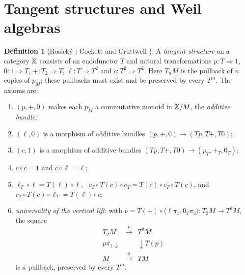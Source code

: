 \documentclass[11pt]{article}
\theoremstyle{definition}\newtheorem{definition}[theorem]{Definition}\newtheorem{remark}[theorem]{Remark}\newtheorem{example}[theorem]{Example}
\begin{document}
\section{Tangent structures and Weil algebras}\label{sec:defs}
\begin{definition}[Rosický \cite{Rosicky1984}; Cockett and Cruttwell \cite{CockettCruttwell2014}]\label{def:tangent}
A \emph{tangent structure} on a category $\mathbb X$ consists of an endofunctor $T$ and natural transformations
$p:T\Rightarrow1$, $0:1\Rightarrow T$, $+:T_2\Rightarrow T$, $\ell:T\Rightarrow T^2$ and $c:T^2\Rightarrow T^2$. Here $T_nM$ is the
pullback of $n$ copies of $p_M$; these pullbacks must exist and be preserved by every $T^m$. The axioms are:
\begin{enumerate}[label=(T\arabic*)]
\item $(p,+,0)$ makes each $p_M$ a commutative monoid in $\mathbb X/M$, the \emph{additive bundle};
\item $(\ell,0)$ is a morphism of additive bundles $(p,+,0)\to(Tp,T{+},T0)$;
\item $(c,1)$ is a morphism of additive bundles $(Tp,T{+},T0)\to(p_T,{+}_T,0_T)$;
\item $c\circ c=1$ and $c\circ\ell=\ell$;
\item $\ell_T\circ\ell=T(\ell)\circ\ell$, \ $c_T\circ T(c)\circ c_T=T(c)\circ c_T\circ T(c)$, and $c_T\circ T(c)\circ\ell_T=T(\ell)\circ c$;
\item \emph{universality of the vertical lift}: with $\nu=T(+)\circ\langle\ell\pi_1,0_T\pi_2\rangle:T_2M\to T^2M$, the square
\[
\begin{array}{ccc}
T_2M&\xrightarrow{\ \nu\ }&T^2M\\
{\scriptstyle p\pi_1}\downarrow&&\downarrow{\scriptstyle T(p)}\\
M&\xrightarrow{\ 0\ }&TM
\end{array}
\]
is a pullback, preserved by every $T^m$.
\end{enumerate}
\end{definition}
\end{document}
